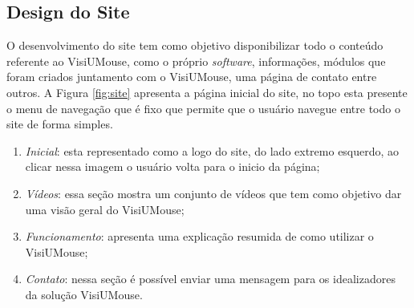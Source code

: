 \subsection{Design do Site}\label{Sub:site}

O desenvolvimento do site tem como objetivo disponibilizar todo o conteúdo referente ao VisiUMouse, como o próprio \textit{software}, informações, módulos que foram criados juntamento com o VisiUMouse, uma página de contato entre outros. A Figura \ref{fig:site} apresenta a página inicial do site, no topo esta presente o menu de navegação que é fixo que permite que o usuário navegue entre todo o site de forma simples.

\begin{enumerate}
\item \textit{Inicial}: esta representado como a logo do site, do lado extremo esquerdo, ao clicar nessa imagem o usuário volta para o inicio da página;

\item \textit{Vídeos}: essa seção mostra um conjunto de vídeos que tem como objetivo dar uma visão geral do VisiUMouse;

\item \textit{Funcionamento}: apresenta uma explicação resumida de como utilizar o VisiUMouse;

\item \textit{Contato}: nessa seção é possível enviar uma mensagem para os idealizadores da solução VisiUMouse.
\end{enumerate}


